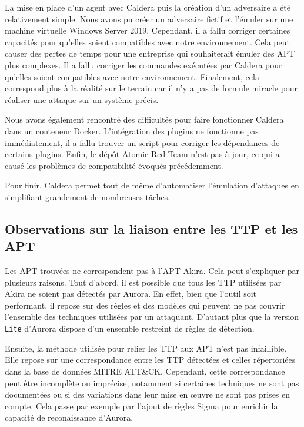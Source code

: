 \documentclass[12pt,letterpaper]{article}
\begin{document}
La mise en place d'un agent avec Caldera puis la création d'un adversaire a été relativement simple.
Nous avons pu créer un adversaire fictif et l'émuler sur une machine virtuelle Windows Server 2019.
Cependant, il a fallu corriger certaines capacités pour qu'elles soient compatibles avec notre environnement.
Cela peut causer des pertes de temps pour une entreprise qui souhaiterait émuler des APT plus complexes.
Il a fallu corriger les commandes exécutées par Caldera pour qu'elles soient compatibles avec notre environnement.
Finalement, cela correspond plus à la réalité sur le terrain car il n'y a pas de formule miracle pour réaliser une attaque sur un système précis.

\bigskip

Nous avons également rencontré des difficultés pour faire fonctionner Caldera dans un conteneur Docker.
L'intégration des plugins ne fonctionne pas immédiatement, il a fallu trouver un script pour corriger les dépendances de certains plugins.
Enfin, le dépôt Atomic Red Team n'est pas à jour, ce qui a causé les problèmes de compatibilité évoqués précédemment.

\bigskip

Pour finir, Caldera permet tout de même d'automatiser l'émulation d'attaques en simplifiant grandement de nombreuses tâches.

\subsection{Observations sur la liaison entre les TTP et les APT}
Les APT trouvées ne correspondent pas à l'APT Akira. Cela peut s'expliquer par plusieurs raisons.
Tout d'abord, il est possible que tous les TTP utilisées par Akira ne soient pas détectés par Aurora.
En effet, bien que l'outil soit performant, il repose sur des règles et des modèles qui peuvent ne pas couvrir l'ensemble des techniques utilisées par un attaquant.
D'autant plus que la version \verb|Lite| d'Aurora dispose d'un ensemble restreint de règles de détection.

\bigskip

Ensuite, la méthode utilisée pour relier les TTP aux APT n'est pas infaillible.
Elle repose sur une correspondance entre les TTP détectées et celles répertoriées dans la base de données MITRE ATT\&CK.
Cependant, cette correspondance peut être incomplète ou imprécise, notamment si certaines techniques ne sont pas documentées ou si des variations dans leur mise en œuvre ne sont pas prises en compte.
Cela passe par exemple par l'ajout de règles Sigma pour enrichir la capacité de reconaissance d'Aurora.
\end{document}
